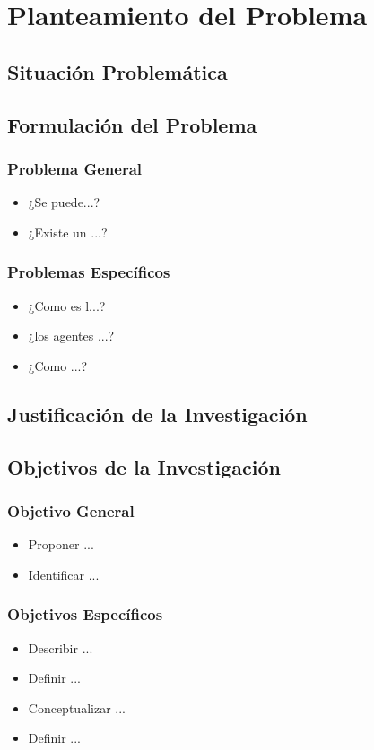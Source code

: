 	\chapter{Planteamiento del Problema}	
		\section{Situación Problemática}
				
		\section{Formulación del Problema}
			\subsection{Problema General}
			\begin{itemize}
				\item ¿Se puede...?	
				\item ¿Existe un ...?
			\end{itemize}
			\subsection{Problemas Específicos}
			\begin{itemize}
			 	\item ¿Como es l...?
			 	\item ¿los agentes ...?
			 	\item ¿Como ...?
			\end{itemize}
		\section{Justificación de la Investigación}
			
		\section{Objetivos de la Investigación}
			\subsection{Objetivo General}
			\begin{itemize}
				\item Proponer ...
				\item Identificar ...
			\end{itemize}
		
			\subsection{Objetivos Específicos}
			\begin{itemize}
				\item Describir ...
				\item Definir ...
				\item Conceptualizar ...
				\item Definir ...
			\end{itemize}
			